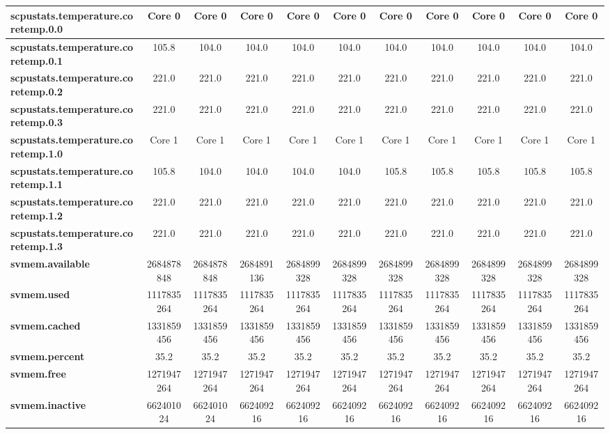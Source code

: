 \begin{sidewaystable}[h]
{\begin{tabular}{|l|c|c|c|c|c|c|c|c|c|c|}
        \textbf{scpustats.temperature.coretemp.0.0} & Core 0 & Core 0 & Core 0 & Core 0 & Core 0 & Core 0 & Core 0 & Core 0 & Core 0 & Core 0 \\ \hline
        \textbf{scpustats.temperature.coretemp.0.1} & 105.8 & 104.0 & 104.0 & 104.0 & 104.0 & 104.0 & 104.0 & 104.0 & 104.0 & 104.0 \\ \hline
        \textbf{scpustats.temperature.coretemp.0.2} & 221.0 & 221.0 & 221.0 & 221.0 & 221.0 & 221.0 & 221.0 & 221.0 & 221.0 & 221.0 \\ \hline
        \textbf{scpustats.temperature.coretemp.0.3} & 221.0 & 221.0 & 221.0 & 221.0 & 221.0 & 221.0 & 221.0 & 221.0 & 221.0 & 221.0 \\ \hline
        \textbf{scpustats.temperature.coretemp.1.0} & Core 1 & Core 1 & Core 1 & Core 1 & Core 1 & Core 1 & Core 1 & Core 1 & Core 1 & Core 1 \\ \hline
        \textbf{scpustats.temperature.coretemp.1.1} & 105.8 & 104.0 & 104.0 & 104.0 & 104.0 & 105.8 & 105.8 & 105.8 & 105.8 & 105.8 \\ \hline
        \textbf{scpustats.temperature.coretemp.1.2} & 221.0 & 221.0 & 221.0 & 221.0 & 221.0 & 221.0 & 221.0 & 221.0 & 221.0 & 221.0 \\ \hline
        \textbf{scpustats.temperature.coretemp.1.3} & 221.0 & 221.0 & 221.0 & 221.0 & 221.0 & 221.0 & 221.0 & 221.0 & 221.0 & 221.0 \\ \hline
        \textbf{svmem.available} & 2684878848 & 2684878848 & 2684891136 & 2684899328 & 2684899328 & 2684899328 & 2684899328 & 2684899328 & 2684899328 & 2684899328 \\ \hline
        \textbf{svmem.used} & 1117835264 & 1117835264 & 1117835264 & 1117835264 & 1117835264 & 1117835264 & 1117835264 & 1117835264 & 1117835264 & 1117835264 \\ \hline
        \textbf{svmem.cached} & 1331859456 & 1331859456 & 1331859456 & 1331859456 & 1331859456 & 1331859456 & 1331859456 & 1331859456 & 1331859456 & 1331859456 \\ \hline
        \textbf{svmem.percent} & 35.2 & 35.2 & 35.2 & 35.2 & 35.2 & 35.2 & 35.2 & 35.2 & 35.2 & 35.2 \\ \hline
        \textbf{svmem.free} & 1271947264 & 1271947264 & 1271947264 & 1271947264 & 1271947264 & 1271947264 & 1271947264 & 1271947264 & 1271947264 & 1271947264 \\ \hline
        \textbf{svmem.inactive} & 662401024 & 662401024 & 662409216 & 662409216 & 662409216 & 662409216 & 662409216 & 662409216 & 662409216 & 662409216 \\ \hline

\end{tabular}}
\end{sidewaystable}
